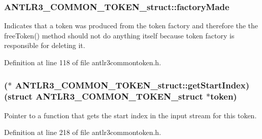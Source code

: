 \hypertarget{struct_a_n_t_l_r3___c_o_m_m_o_n___t_o_k_e_n__struct_a8464f5dc1b758f4cae8c0b20881106e7}{
\subsubsection[{factory\-Made}]{ A\-N\-T\-L\-R3\-\_\-\-C\-O\-M\-M\-O\-N\-\_\-\-T\-O\-K\-E\-N\-\_\-struct\-::factory\-Made}}\label{struct_a_n_t_l_r3___c_o_m_m_o_n___t_o_k_e_n__struct_a8464f5dc1b758f4cae8c0b20881106e7}
Indicates that a token was produced from the token factory and therefore the the free\-Token() method should not do anything itself because token factory is responsible for deleting it. 

Definition at line 118 of file antlr3commontoken.\-h.

\hypertarget{struct_a_n_t_l_r3___c_o_m_m_o_n___t_o_k_e_n__struct_aa41d51a857a617266a6aad2108f363a6}{
\subsubsection[{get\-Start\-Index}]{($\ast$ A\-N\-T\-L\-R3\-\_\-\-C\-O\-M\-M\-O\-N\-\_\-\-T\-O\-K\-E\-N\-\_\-struct\-::get\-Start\-Index)(struct {\bf A\-N\-T\-L\-R3\-\_\-\-C\-O\-M\-M\-O\-N\-\_\-\-T\-O\-K\-E\-N\-\_\-struct} $\ast$token)}}\label{struct_a_n_t_l_r3___c_o_m_m_o_n___t_o_k_e_n__struct_aa41d51a857a617266a6aad2108f363a6}
Pointer to a function that gets the start index in the input stream for this token. 

Definition at line 218 of file antlr3commontoken.\-h.

